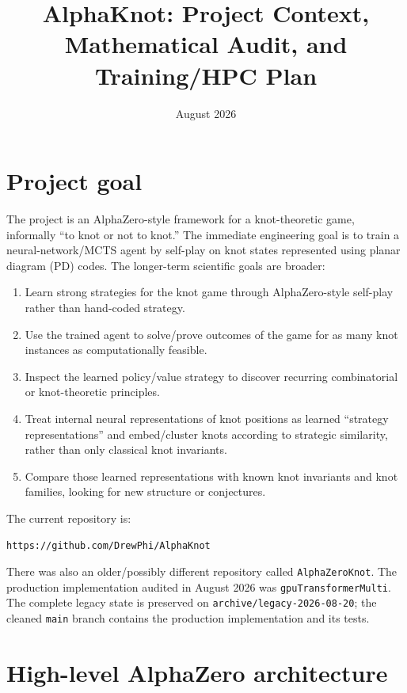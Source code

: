 \documentclass[11pt]{article}
\title{AlphaKnot: Project Context, Mathematical Audit, and Training/HPC Plan}
\author{}
\date{August 2026}
\begin{document}
\maketitle

\section{Project goal}

The project is an AlphaZero-style framework for a knot-theoretic game, informally ``to knot or not to knot.'' The immediate engineering goal is to train a neural-network/MCTS agent by self-play on knot states represented using planar diagram (PD) codes. The longer-term scientific goals are broader:

\begin{enumerate}[label=\arabic*.]
    \item Learn strong strategies for the knot game through AlphaZero-style self-play rather than hand-coded strategy.
    \item Use the trained agent to solve/prove outcomes of the game for as many knot instances as computationally feasible.
    \item Inspect the learned policy/value strategy to discover recurring combinatorial or knot-theoretic principles.
    \item Treat internal neural representations of knot positions as learned ``strategy representations'' and embed/cluster knots according to strategic similarity, rather than only classical knot invariants.
    \item Compare those learned representations with known knot invariants and knot families, looking for new structure or conjectures.
\end{enumerate}

The current repository is:

\begin{verbatim}
https://github.com/DrewPhi/AlphaKnot
\end{verbatim}

There was also an older/possibly different repository called \texttt{AlphaZeroKnot}. The production implementation audited in August 2026 was \texttt{gpuTransformerMulti}. The complete legacy state is preserved on \texttt{archive/legacy-2026-08-20}; the cleaned \texttt{main} branch contains the production implementation and its tests.

\section{High-level AlphaZero architecture}
\end{document}
